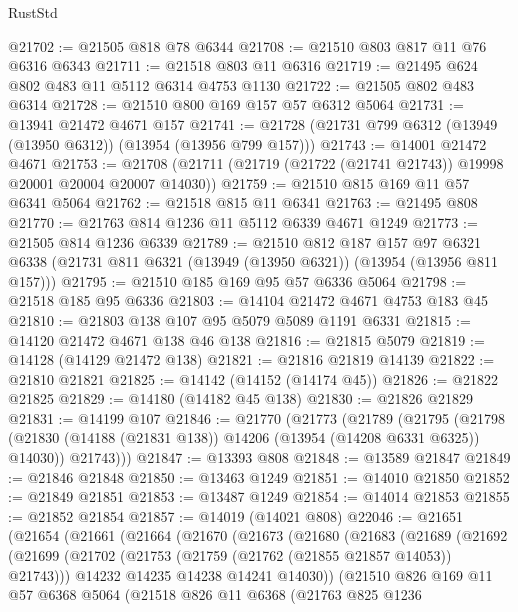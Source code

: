 \begin{lexlean}{RustStd}
\begin{coremodule}
@21702 := @21505 @818 @78 @6344
@21708 := @21510 @803 @817 @11 @76 @6316 @6343
@21711 := @21518 @803 @11 @6316
@21719 := @21495 @624 @802 @483 @11 @5112 @6314 @4753 @1130
@21722 := @21505 @802 @483 @6314
@21728 := @21510 @800 @169 @157 @57 @6312 @5064
@21731 := @13941 @21472 @4671 @157
@21741 := @21728 (@21731 @799 @6312 (@13949 (@13950 @6312)) (@13954 (@13956 @799 @157)))
@21743 := @14001 @21472 @4671
@21753 := @21708 (@21711 (@21719 (@21722 (@21741 @21743)) @19998 @20001 @20004 @20007 @14030))
@21759 := @21510 @815 @169 @11 @57 @6341 @5064
@21762 := @21518 @815 @11 @6341
@21763 := @21495 @808
@21770 := @21763 @814 @1236 @11 @5112 @6339 @4671 @1249
@21773 := @21505 @814 @1236 @6339
@21789 := @21510
    @812
    @187
    @157
    @97
    @6321
    @6338
    (@21731 @811 @6321 (@13949 (@13950 @6321)) (@13954 (@13956 @811 @157)))
@21795 := @21510 @185 @169 @95 @57 @6336 @5064
@21798 := @21518 @185 @95 @6336
@21803 := @14104 @21472 @4671 @4753 @183 @45
@21810 := @21803 @138 @107 @95 @5079 @5089 @1191 @6331
@21815 := @14120 @21472 @4671 @138 @46 @138
@21816 := @21815 @5079
@21819 := @14128 (@14129 @21472 @138)
@21821 := @21816 @21819 @14139
@21822 := @21810 @21821
@21825 := @14142 (@14152 (@14174 @45))
@21826 := @21822 @21825
@21829 := @14180 (@14182 @45 @138)
@21830 := @21826 @21829
@21831 := @14199 @107
@21846 := @21770
    (@21773
      (@21789
        (@21795
          (@21798 (@21830 (@14188 (@21831 @138)) @14206 (@13954 (@14208 @6331 @6325)) @14030))
          @21743)))
@21847 := @13393 @808
@21848 := @13589 @21847
@21849 := @21846 @21848
@21850 := @13463 @1249
@21851 := @14010 @21850
@21852 := @21849 @21851
@21853 := @13487 @1249
@21854 := @14014 @21853
@21855 := @21852 @21854
@21857 := @14019 (@14021 @808)
@22046 := @21651
    (@21654
      (@21661
        (@21664
          (@21670
            (@21673
              (@21680
                (@21683
                  (@21689
                    (@21692
                      (@21699
                        (@21702 (@21753 (@21759 (@21762 (@21855 @21857 @14053)) @21743)))
                        @14232
                        @14235
                        @14238
                        @14241
                        @14030))
                    (@21510
                      @826
                      @169
                      @11
                      @57
                      @6368
                      @5064
                      (@21518
                        @826
                        @11
                        @6368
                        (@21763
                          @825
                          @1236

\end{coremodule}
\end{lexlean}
